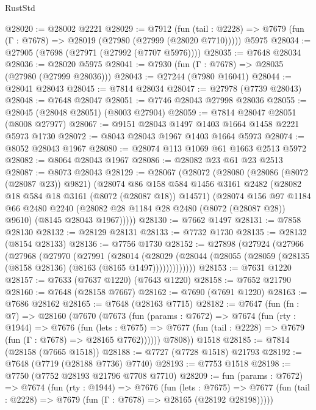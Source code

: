 \begin{lexlean}{RustStd}
\begin{coremodule}
@28020 := @28002 @2221
@28029 := @7912
    (fun (tail : @2228) => @7679 (fun (Γ : @7678) => @28019 (@27980 (@27999 (@28020 @7710)))))
    @5975
@28034 := @27905 (@7698 (@27971 (@27992 (@7707 @5976))))
@28035 := @7648 @28034
@28036 := @28020 @5975
@28041 := @7930 (fun (Γ : @7678) => @28035 (@27980 (@27999 @28036)))
@28043 := @27244 (@7980 @16041)
@28044 := @28041 @28043
@28045 := @7814 @28034
@28047 := @27978 (@7739 @28043)
@28048 := @7648 @28047
@28051 := @7746 @28043 @27998 @28036
@28055 := @28045 (@28048 @28051) (@8003 @27904)
@28059 := @7814 @28047 @28051 (@8008 @27977)
@28067 := @9151 @28043 @1497 @1403 @1664 @1458 @2221 @5973 @1730
@28072 := @8043 @28043 @1967 @1403 @1664 @5973
@28074 := @8052 @28043 @1967
@28080 := @28074 @113 @1069 @61 @1663 @2513 @5972
@28082 := @8064 @28043 @1967
@28086 := @28082 @23 @61 @23 @2513
@28087 := @8073 @28043
@28129 := @28067
    (@28072
      (@28080
        (@28086 (@8072 (@28087 @23)) @9821)
        (@28074
          @86
          @158
          @584
          @1456
          @3161
          @2482
          (@28082 @18 @584 @18 @3161 (@8072 (@28087 @18)) @14571)
          (@28074
            @156
            @97
            @1184
            @66
            @2480
            @2240
            (@28082 @28 @1184 @28 @2480 (@8072 (@28087 @28)) @9610)
            (@8145 @28043 @1967)))))
@28130 := @7662 @1497
@28131 := @7858 @28130
@28132 := @28129 @28131
@28133 := @7732 @1730
@28135 := @28132 (@8154 @28133)
@28136 := @7756 @1730
@28152 := @27898
    (@27924
      (@27966
        (@27968
          (@27970
            (@27991
              (@28014
                (@28029
                  (@28044 (@28055 (@28059 (@28135 (@8158 @28136) (@8163 (@8165 @1497)))))))))))))
@28153 := @7631 @1220
@28157 := @7633 (@7637 @1220) (@7643 @1220)
@28158 := @7652 @21790
@28160 := @7648 (@28158 @7667)
@28162 := @7690 (@7691 @1220)
@28163 := @7686 @28162
@28165 := @7648 (@28163 @7715)
@28182 := @7647
    (fun (fn : @7) =>
    @28160
      (@7670
        (@7673
          (fun (params : @7672) =>
          @7674
            (fun (rty : @1944) =>
            @7676
              (fun (lets : @7675) =>
              @7677 (fun (tail : @2228) => @7679 (fun (Γ : @7678) => @28165 @7762))))))
        @7808))
    @1518
@28185 := @7814 (@28158 (@7665 @1518))
@28188 := @7727 (@7728 @1518) @21793
@28192 := @7648 (@7719 (@28188 @7736) @7740)
@28193 := @7753 @1518
@28198 := @7750 (@7752 @28193 @21796 @7708 @7710)
@28209 := fun (params : @7672) =>
  @7674
    (fun (rty : @1944) =>
    @7676
      (fun (lets : @7675) =>
      @7677 (fun (tail : @2228) => @7679 (fun (Γ : @7678) => @28165 (@28192 @28198)))))

\end{coremodule}
\end{lexlean}
